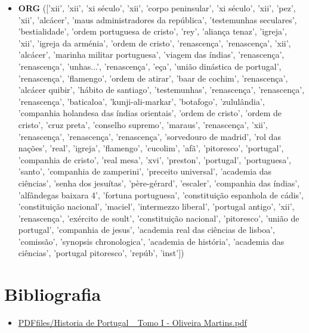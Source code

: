 \documentclass{article}
\begin{document}
\begin{itemize}
brasil', 'independência do império', 'xvi século em portugal', 'fr', 'fr', 'xvi século', 'portugal ii', 'iv', 'iv', 'ii', 'filipes iii', 'iv', 'invasão francesa iii.', 'iv', 'vi', 'guerra dos antigos', '365-6', 'xvi', 'liv', 'iii', 'iii', 'iv', 'vii', 'i', 'ii', 'cadeirinha da marquesa de távora'])
\item \textbf{ORG} (['xii', 'xii', 'xi século', 'xii', 'corpo peninsular', 'xi século', 'xii', 'pez', 'xii', 'alcácer', 'maus administradores da república', 'testemunhas seculares', 'bestialidade', 'ordem portuguesa de cristo', 'rey', 'aliança tenaz', 'igreja', 'xii', 'igreja da arménia', 'ordem de cristo', 'renascença', 'renascença', 'xii', 'alcácer', 'marinha militar portuguesa', 'viagem das índias', 'renascença', 'renascença', 'unhas...', 'renascença', 'eça', 'união dinástica de portugal', 'renascença', 'flamengo', 'ordem de atirar', 'baar de cochim', 'renascença', 'alcácer quibir', 'hábito de santiago', 'testemunhas', 'renascença', 'renascença', 'renascença', 'baticaloa', 'kunji-ali-markar', 'botafogo', 'zululândia', 'companhia holandesa das índias orientais', 'ordem de cristo', 'ordem de cristo', 'cruz preta', 'conselho supremo', 'maraus', 'renascença', 'xii', 'renascença', 'renascença', 'renascença', 'sorvedouro de madrid', 'rol das nações', 'real', 'igreja', 'flamengo', 'cucolim', 'afã', 'pitoresco', 'portugal', 'companhia de cristo', 'real mesa', 'xvi', 'preston', 'portugal', 'portuguesa', 'santo', 'companhia de zamperini', 'preceito universal', 'academia das ciências', 'senha dos jesuítas', 'père-gérard', 'escaler', 'companhia das índias', 'alfândegas baixara 4', 'fortuna portuguesa', 'constituição espanhola de cádis', 'constituição nacional', 'maciel', 'intermezzo liberal', 'portugal antigo', 'xii', 'renascença', 'exército de soult', 'constituição nacional', 'pitoresco', 'união de portugal', 'companhia de jesus', 'academia real das ciências de lisboa', 'comissão', 'synopsis chronologica', 'academia de história', 'academia das ciências', 'portugal pitoresco', 'repúb', 'inst'])
\end{itemize}

\section{Bibliografia}
\begin{itemize}
\item \url{PDFfiles/Historia de Portugal_ Tomo I - Oliveira Martins.pdf}
\end{itemize}
\end{document}
